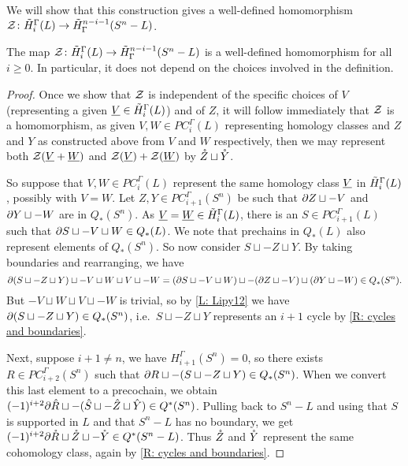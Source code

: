 We will show that this construction gives a well-defined homomorphism $\mathcal{Z} \colon \tilde H_i^\Gamma(L) \to \tilde H^{n-i-1}_\Gamma(S^n-L)$.



\begin{proposition}
	The map $\mathcal{Z} \colon \tilde H_i^\Gamma(L) \to \tilde H^{n-i-1}_\Gamma(S^n-L)$ is a well-defined homomorphism for all $i \geq 0$.
	In particular, it does not depend on the choices involved in the definition.
\end{proposition}
\begin{proof}
	Once we show that $\mathcal{Z}$ is independent of the specific choices of $V$ (representing a given $\underline{V} \in \tilde H_i^\Gamma(L)$) and of $Z$, it will follow immediately that $\mathcal{Z}$ is a homomorphism, as given $V,W\in PC_i^\Gamma(L)$ representing homology classes and $Z$ and $Y$ as constructed above from $V$ and $W$ respectively, then we may represent both $\mathcal{Z}(\underline{V} + \underline{W})$ and $\mathcal{Z}(\underline{V}) + \mathcal{Z}(\underline{W})$ by $\mathring{Z} \sqcup \mathring{Y}$.

	So suppose that $V,W \in PC_i^\Gamma(L)$ represent the same homology class $\underline{V}$ in $\tilde H_i^\Gamma(L)$, possibly with $V = W$.
	Let $Z,Y \in PC_{i+1}^\Gamma(S^n)$ be such that $\partial Z \sqcup -V$ and $\partial Y \sqcup -W$ are in $Q_*(S^n)$.
	As $\underline{V}=\underline{W} \in \tilde H_i^\Gamma(L)$, there is an $S \in PC_{i+1}^\Gamma(L)$ such that $\partial S \sqcup -V \sqcup W \in Q_*(L)$.
	We note that prechains in $Q_*(L)$ also represent elements of $Q_*(S^n)$.
	So now consider $S \sqcup -Z \sqcup Y$.
	By taking boundaries and rearranging, we have $$\partial (S \sqcup -Z \sqcup Y)\sqcup -V \sqcup W \sqcup V \sqcup -W = (\partial S \sqcup -V \sqcup W)\sqcup -(\partial Z \sqcup -V) \sqcup (\partial Y\sqcup -W)\in Q_*(S^n).$$
	But $-V \sqcup W \sqcup V \sqcup -W$ is trivial, so by \cref{L: Lipy12} we have $\partial(S \sqcup -Z \sqcup Y)\in Q_*(S^n)$, i.e.\ $S \sqcup -Z \sqcup Y$ represents an $i+1$ cycle by \cref{R: cycles and boundaries}.

	Next, suppose $i+1\neq n$, we have $H_{i+1}^\Gamma(S^n) = 0$, so there exists $R \in PC_{i+2}^\Gamma(S^n)$ such that $\partial R \sqcup -(S \sqcup -Z \sqcup Y) \in Q_*(S^n)$.
	When we convert this last element to a precochain, we obtain $(-1)^{i+2}\partial \hat R \sqcup -(\hat S \sqcup -\hat Z \sqcup \hat Y) \in Q^*(S^n)$.
	Pulling back to $S^n - L$ and using that $S$ is supported in $L$ and that $S^n - L$ has no boundary, we get
	$(-1)^{i+2}\partial \mathring{R} \sqcup \mathring{Z} \sqcup -\mathring{Y} \in Q^*(S^n - L)$.
	Thus $\mathring{Z}$ and $\mathring{Y}$ represent the same cohomology class, again by \cref{R: cycles and boundaries}.


\end{proof}
